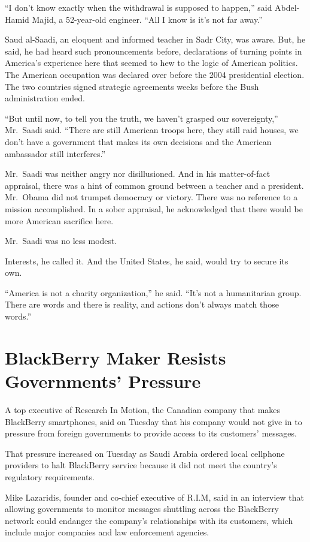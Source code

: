 ﻿\documentclass[12pt]{article}
\begin{document}
``I don't know exactly when the withdrawal is supposed to happen,'' said Abdel-Hamid Majid, a
52-year-old engineer. ``All I know is it's not far away.''

Saud al-Saadi, an eloquent and informed teacher in Sadr City, was aware. But, he said, he had heard
such pronouncements before, declarations of turning points in America's experience here that seemed
to hew to the logic of American politics. The American occupation was declared over before the 2004
presidential election. The two countries signed strategic agreements weeks before the Bush
administration ended.

``But until now, to tell you the truth, we haven't grasped our sovereignty,'' Mr.~Saadi said.
``There are still American troops here, they still raid houses, we don't have a government that
makes its own decisions and the American ambassador still interferes.''

Mr.~Saadi was neither angry nor disillusioned. And in his matter-of-fact appraisal, there was a hint
of common ground between a teacher and a president. Mr.~Obama did not trumpet democracy or victory.
There was no reference to a mission accomplished. In a sober appraisal, he acknowledged that there
would be more American sacrifice here.

Mr.~Saadi was no less modest.

Interests, he called it. And the United States, he said, would try to secure its own.

``America is not a charity organization,'' he said. ``It's not a humanitarian group. There are words
and there is reality, and actions don't always match those words.''

\section{BlackBerry Maker Resists Governments' Pressure}

\lettrine{A}{} top executive of Research In Motion, the Canadian company
that makes BlackBerry smartphones, said on Tuesday that his company would not give in to pressure
from foreign governments to provide access to its customers' messages.

That pressure increased on Tuesday as Saudi Arabia ordered local cellphone providers to halt
BlackBerry service because it did not meet the country's regulatory requirements.

Mike Lazaridis, founder and co-chief executive of R.I.M, said in an interview that allowing
governments to monitor messages shuttling across the BlackBerry network could endanger the company's
relationships with its customers, which include major companies and law enforcement agencies.
\end{document}
